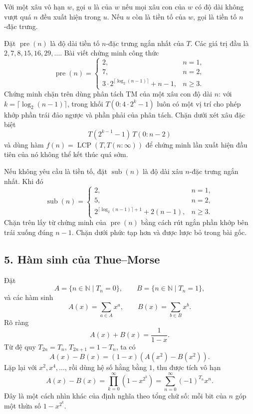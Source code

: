 \documentclass[11pt]{article}
\begin{document}
Với một xâu vô hạn \(w\), gọi \(u\) là  của \(w\) nếu mọi
xâu con của \(w\) có độ dài không vượt quá \(n\) đều xuất hiện trong \(u\). Nếu
\(u\) còn là tiền tố của \(w\), gọi là tiền tố \(n\)-đặc trưng.

Đặt \(\operatorname{pre}(n)\) là độ dài tiền tố \(n\)-đặc trưng ngắn nhất của
\(T\). Các giá trị đầu là \(2,7,8,15,16,29,\ldots\). Bài viết chứng minh công
thức
\[
\operatorname{pre}(n)=
\begin{cases}
2, & n=1,\\
7, & n=2,\\
3\cdot 2^{\lceil\log_2(n-1)\rceil}+n-1, & n\ge3.
\end{cases}
\]
Chứng minh chặn trên dùng phân tách TM của một xâu con độ dài \(n\): với
\(k=\lceil\log_2(n-1)\rceil\), trong khối \(T(0:4\cdot2^k-1)\) luôn có một vị
trí cho phép khớp phần trái đảo ngược và phần phải của phân tách. Chặn dưới
xét xâu đặc biệt
\[
  T(2^{k-1}-1)\,T(0:n-2)
\]
và dùng hàm \(f(n)=\operatorname{LCP}(T,T(n:\infty))\) để chứng minh lần xuất
hiện đầu tiên của nó không thể kết thúc quá sớm.

Nếu không yêu cầu là tiền tố, đặt \(\operatorname{sub}(n)\) là độ dài xâu
\(n\)-đặc trưng ngắn nhất. Khi đó
\[
\operatorname{sub}(n)=
\begin{cases}
2, & n=1,\\
5, & n=2,\\
2^{\lceil\log_2(n-1)\rceil+1}+2(n-1), & n\ge3.
\end{cases}
\]
Chặn trên lấy từ chứng minh của \(\operatorname{pre}(n)\) bằng cách rút ngắn
phần khớp bên trái xuống đúng \(n-1\). Chặn dưới phức tạp hơn và được lược bỏ
trong bài gốc.

\subsection*{5. Hàm sinh của Thue--Morse}

Đặt
\[
  A=\{n\in\mathbb N\mid T_n=0\},\qquad
  B=\{n\in\mathbb N\mid T_n=1\},
\]
và các hàm sinh
\[
  A(x)=\sum_{a\in A}x^a,\qquad B(x)=\sum_{b\in B}x^b.
\]
Rõ ràng
\[
  A(x)+B(x)=\frac1{1-x}.
\]
Từ đệ quy \(T_{2n}=T_n\), \(T_{2n+1}=1-T_n\), ta có
\[
  A(x)-B(x)=(1-x)(A(x^2)-B(x^2)).
\]
Lặp lại với \(x^2,x^4,\ldots\), rồi dùng hệ số hằng bằng \(1\), thu được tích
vô hạn
\[
  A(x)-B(x)=\prod_{k=0}^{\infty}(1-x^{2^k})
  =\sum_{n=0}^{\infty}(-1)^{T_n}x^n.
\]
Đây là một cách nhìn khác của định nghĩa theo tổng chữ số: mỗi bit của \(n\)
góp một thừa số \(1-x^{2^k}\).
\end{document}
